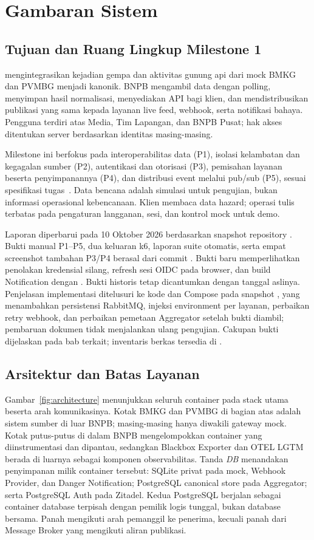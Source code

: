 \chapter{Gambaran Sistem}
\section{Tujuan dan Ruang Lingkup Milestone 1}
\NamaSistem{} mengintegrasikan kejadian gempa dan aktivitas gunung api dari mock BMKG dan PVMBG menjadi  kanonik. BNPB mengambil data dengan polling, menyimpan hasil normalisasi, menyediakan API bagi klien, dan mendistribusikan publikasi yang sama kepada layanan live feed, webhook, serta notifikasi bahaya. Pengguna terdiri atas Media, Tim Lapangan, dan BNPB Pusat; hak akses ditentukan server berdasarkan identitas masing-masing.

Milestone ini berfokus pada interoperabilitas data (P1), isolasi kelambatan dan kegagalan sumber (P2), autentikasi dan otorisasi (P3), pemisahan layanan beserta penyimpanannya (P4), dan distribusi event melalui pub/sub (P5), sesuai spesifikasi tugas~\cite{spec}. Data bencana adalah simulasi untuk pengujian, bukan informasi operasional kebencanaan. Klien membaca data hazard; operasi tulis terbatas pada pengaturan langganan, sesi, dan kontrol mock untuk demo.

Laporan diperbarui pada 10 Oktober 2026 berdasarkan snapshot repository . Bukti manual P1--P5, dua keluaran k6, laporan suite otomatis, serta empat screenshot tambahan P3/P4 berasal dari commit . Bukti baru memperlihatkan penolakan kredensial silang, refresh sesi OIDC pada browser, dan build Notification dengan . Bukti historis tetap dicantumkan dengan tanggal aslinya. Penjelasan implementasi ditelusuri ke kode dan Compose pada snapshot , yang menambahkan persistensi RabbitMQ, injeksi environment per layanan, perbaikan retry webhook, dan perbaikan pemetaan Aggregator setelah bukti diambil; pembaruan dokumen tidak menjalankan ulang pengujian. Cakupan bukti dijelaskan pada bab terkait; inventaris berkas tersedia di .

\section{Arsitektur dan Batas Layanan}
Gambar~\ref{fig:architecture} menunjukkan seluruh container pada stack utama beserta arah komunikasinya. Kotak BMKG dan PVMBG di bagian atas adalah sistem sumber di luar BNPB; masing-masing hanya diwakili gateway mock. Kotak putus-putus di dalam BNPB mengelompokkan container yang diinstrumentasi dan dipantau, sedangkan Blackbox Exporter dan OTEL LGTM berada di luarnya sebagai komponen observabilitas. Tanda \emph{DB} menandakan penyimpanan milik container tersebut: SQLite privat pada mock, Webhook Provider, dan Danger Notification; PostgreSQL canonical store pada Aggregator; serta PostgreSQL Auth pada Zitadel. Kedua PostgreSQL berjalan sebagai container database terpisah dengan pemilik logis tunggal, bukan database bersama. Panah mengikuti arah pemanggil ke penerima, kecuali panah dari Message Broker yang mengikuti aliran publikasi.

